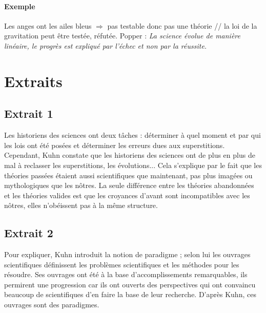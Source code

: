 \paragraph{Exemple}
Les anges ont les ailes bleus $\Rightarrow$ pas testable donc pas une théorie // la loi de la gravitation peut être testée, réfutée.
Popper : \emph{La science évolue de manière linéaire, le progrès est expliqué par l'échec et non par la réussite.}
\section{Extraits}
\subsection{Extrait 1}
Les historiens des sciences ont deux tâches : déterminer à quel moment et par qui les lois ont été posées et déterminer les erreurs dues aux superstitions.
Cependant, Kuhn constate que les historiens des sciences ont de plus en plus de mal à reclasser les superstitions, les évolutions...
Cela s'explique par le fait que les théories passées étaient aussi scientifiques que maintenant, pas plus imagées ou mythologiques que les nôtres.
La seule différence entre les théories abandonnées et les théories valides est que les croyances d'avant sont incompatibles avec les nôtres, elles n'obéissent pas à la même structure.
\subsection{Extrait 2}
Pour expliquer, Kuhn introduit la notion de paradigme ; selon lui les ouvrages scientifiques définissent les problèmes scientifiques et les méthodes pour les résoudre.
Ses ouvrages ont été à la base d'accomplissements remarquables, ils permirent une progression car ils ont ouverts des perspectives qui ont convaincu beaucoup de scientifiques d'en faire la base de leur recherche.
D'après Kuhn, ces ouvrages sont des paradigmes.

